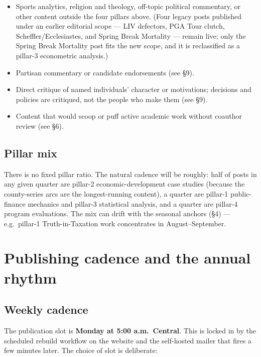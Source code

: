 \documentclass[11pt]{article}
\begin{document}
\begin{itemize}
\item Sports analytics, religion and theology, off-topic
political commentary, or other content outside the four pillars
above. (Four legacy posts published under an earlier editorial
scope --- LIV defectors, PGA Tour clutch, Scheffler/Ecclesiastes,
and Spring Break Mortality --- remain live; only the Spring
Break Mortality post fits the new scope, and it is reclassified
as a pillar-3 econometric analysis.)
\item Partisan commentary or candidate endorsements (see \S 9).
\item Direct critique of named individuals' character or
motivations; decisions and policies are critiqued, not the
people who make them (see \S 9).
\item Content that would scoop or puff active academic work
without coauthor review (see \S 6).
\end{itemize}

\subsection{Pillar mix}

There is no fixed pillar ratio. The natural cadence will be
roughly: half of posts in any given quarter are pillar-2
economic-development case studies (because the county-series
arcs are the longest-running content), a quarter are pillar-1
public-finance mechanics and pillar-3 statistical analysis, and
a quarter are pillar-4 program evaluations. The mix can drift
with the seasonal anchors (\S 4) --- e.g.\ pillar-1
Truth-in-Taxation work concentrates in August--September.

\section{Publishing cadence and the annual rhythm}

\subsection{Weekly cadence}

The publication slot is \textbf{Monday at 5:00 a.m.\ Central}. This
is locked in by the scheduled rebuild workflow on the website and
the self-hosted mailer that fires a few minutes later. The choice
of slot is deliberate:
\end{document}

